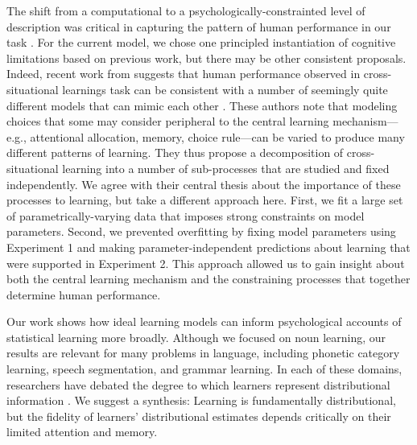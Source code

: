 \documentclass{pnastwo}
\begin{document}
\begin{article}
The shift from a computational to a psychologically-constrainted level of description was critical in capturing the pattern of human performance in our task \citep{Marr1982,Frank2010a,Yurovsky2012c}. For the current model, we chose one principled instantiation of cognitive limitations based on previous work, but there may be other consistent proposals. Indeed, recent work from \citep{Yu2012b} suggests that human performance observed in cross-situational learnings task can be consistent with a number of seemingly quite different models that can mimic each other \citep[see also,][]{Townsend1990}. These authors note that modeling choices that some may consider peripheral to the central learning mechanism---e.g., attentional allocation, memory, choice rule---can be varied to produce many different patterns of learning. They thus propose a decomposition of cross-situational learning into a number of sub-processes that are studied and fixed independently. We agree with their central thesis about the importance of these processes to learning, but take a different approach here. First, we fit a large set of parametrically-varying data that imposes strong constraints on model parameters. Second, we prevented overfitting by fixing model parameters using Experiment 1 and making parameter-independent predictions about learning that were supported in Experiment 2. This approach allowed us to gain insight about both the central learning mechanism and the constraining processes that together determine human performance.

Our work shows how ideal learning models can inform psychological accounts of statistical learning more broadly. Although we focused on noun learning, our results are relevant for many problems in language, including phonetic category learning, speech segmentation, and grammar learning. In each of these domains, researchers have debated the degree to which learners represent distributional information \citep{Endress2005, Frank2010a, McMurray2013}. We suggest a synthesis: Learning is fundamentally distributional, but the fidelity of learners' distributional estimates depends critically on their limited attention and memory.
%
%

\begin{materials}


\end{materials}
\end{article}
\end{document}
